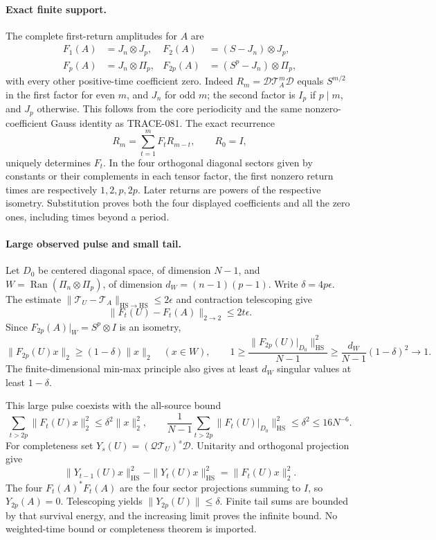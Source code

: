 \paragraph{Exact finite support.}
The complete first-return amplitudes for \(A\) are
\[
\begin{aligned}
 F_1(A)&=J_n\otimes J_p,&
 F_2(A)&=(S-J_n)\otimes J_p,\\
 F_p(A)&=J_n\otimes\Pi_p,&
 F_{2p}(A)&=(S^p-J_n)\otimes\Pi_p,
\end{aligned}
\]
with every other positive-time coefficient zero.
Indeed \(R_m=\mathcal D\mathcal T_A^m\mathcal D\) equals
\(S^{m/2}\) in the first factor for even \(m\), and \(J_n\) for
odd \(m\); the second factor is \(I_p\) if \(p\mid m\), and \(J_p\)
otherwise. This follows from the core periodicity and the same
nonzero-coefficient Gauss identity as TRACE-081.
The exact recurrence
\[
 R_m=\sum_{t=1}^m F_t R_{m-t},\qquad R_0=I,
\]
uniquely determines \(F_t\). In the four orthogonal diagonal sectors
given by constants or their complements in each tensor factor,
the first nonzero return times are respectively \(1,2,p,2p\).
Later returns are powers of the respective isometry. Substitution
proves both the four displayed coefficients and all the zero ones,
including times beyond a period.

\paragraph{Large observed pulse and small tail.}
Let \(D_0\) be centered diagonal space, of dimension \(N-1\), and
\(W=\operatorname{Ran}(\Pi_n\otimes\Pi_p)\), of dimension
\(d_W=(n-1)(p-1)\). Write \(\delta=4p\epsilon\).
The estimate
\(\|\mathcal T_U-\mathcal T_A\|_{\mathrm{HS}\to\mathrm{HS}}
\le2\epsilon\) and contraction telescoping give
\[
 \|F_t(U)-F_t(A)\|_{2\to2}\le2t\epsilon.
\]
Since \(F_{2p}(A)|_W=S^p\otimes I\) is an isometry,
\[
 \|F_{2p}(U)x\|_2\ge(1-\delta)\|x\|_2\quad(x\in W),
 \qquad
 1\ge\frac{\|F_{2p}(U)|_{D_0}\|_{\mathrm{HS}}^2}{N-1}
 \ge\frac{d_W}{N-1}(1-\delta)^2\longrightarrow1.
\]
The finite-dimensional min-max principle also gives at least \(d_W\)
singular values at least \(1-\delta\).

This large pulse coexists with the all-source bound
\[
 \sum_{t>2p}\|F_t(U)x\|_2^2\le\delta^2\|x\|_2^2,\qquad
 \frac1{N-1}\sum_{t>2p}\|F_t(U)|_{D_0}\|_{\mathrm{HS}}^2
       \le\delta^2\le16N^{-6}.
\]
For completeness set \(Y_s(U)=(\mathcal Q\mathcal T_U)^s\mathcal D\).
Unitarity and orthogonal projection give
\[
 \|Y_{t-1}(U)x\|_{\mathrm{HS}}^2-\|Y_t(U)x\|_{\mathrm{HS}}^2
       =\|F_t(U)x\|_2^2.
\]
The four \(F_t(A)^*F_t(A)\) are the four sector projections summing
to \(I\), so \(Y_{2p}(A)=0\). Telescoping yields
\(\|Y_{2p}(U)\|\le\delta\). Finite tail sums are bounded by that
survival energy, and the increasing limit proves the infinite bound.
No weighted-time bound or completeness theorem is imported.

